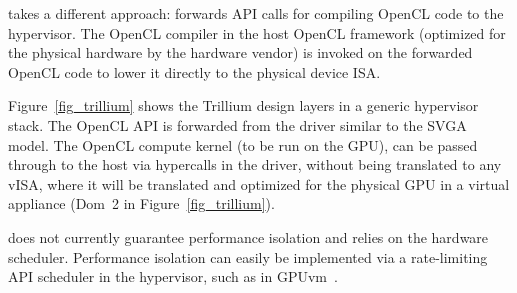 \Trillium takes a different approach:
\Trillium forwards API calls for compiling OpenCL code to the hypervisor.
The OpenCL compiler in the host OpenCL framework
(optimized for the physical hardware by the hardware vendor)
is invoked on the forwarded OpenCL code to lower it directly to the physical device ISA.


Figure~\ref{fig_trillium} shows the Trillium design layers in a
generic hypervisor stack. The OpenCL API is forwarded from the
driver similar to the SVGA model.  The OpenCL compute kernel (to be
run on the GPU), can be passed through to the host via hypercalls in
the driver, without being translated to any vISA, where it will
be translated and optimized for the physical GPU in a virtual appliance (Dom~2 in Figure~\ref{fig_trillium}).

\Trillium does not currently guarantee performance isolation and relies on the hardware scheduler.
Performance isolation can easily be implemented via a rate-limiting API scheduler in the
hypervisor, such as in GPUvm~\cite{GPUvm}.






